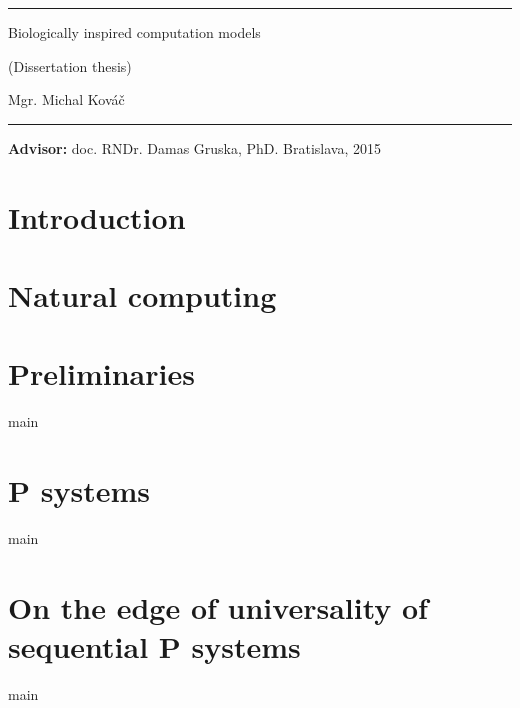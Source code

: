 \documentclass[a4paper,12pt,oneside,openany]{book}
\def\mftitlea{Biologically inspired computation models}
\def\mfthesistype{Dissertation thesis}
\def\mfauthor{Mgr. Michal Kováč}
\def\mfadvisor{doc. RNDr. Damas Gruska, PhD.}
\def\mfplacedate{Bratislava, 2015}
\begin{document}
\vfill
\begin{center}
\begin{minipage}{0.8\textwidth}
\hrule
\bigskip\bigskip
\centerline{\LARGE\sc\mftitlea}
\smallskip
\centerline{(\mfthesistype)}
\bigskip
\bigskip
\centerline{\large\sc\mfauthor}
\bigskip\bigskip
\hrule
\end{minipage}
\end{center}
\vfill
{\bf Advisor:} \mfadvisor
\hfill\mfplacedate
\eject
\eject

\thispagestyle{empty}{~}




\tableofcontents{}
\listoffigures{}
\listofalgorithms{}

\mainmatter

\chapter*{Introduction} %
\label{cha:introduction}



\chapter{Natural computing} %
\label{cha:natural_computing}



\chapter{Preliminaries} %
\label{cha:preliminaries}
{main}


\chapter{P systems} %
\label{cha:p_systems}
{main}


\chapter{On the edge of universality of sequential P systems} %
\label{cha:on_the_edge_of_universality_of_sequential_p_systems}
{main}



\backmatter





\printindex
\end{document}
